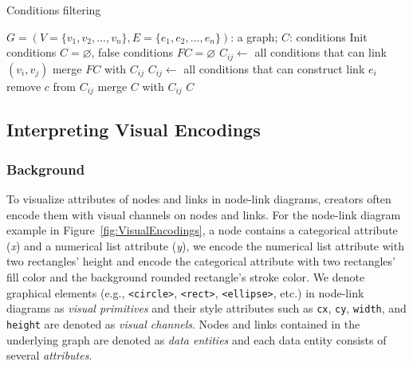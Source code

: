 


\begin{algorithm}[!t]
    \renewcommand\arraystretch{1.2}
    \caption{ Conditions filtering }
    \label{alg:conditions}
    \begin{algorithmic}[1]
        \Require
            $G=(V=\{v_1, v_2, ..., v_n\}, E=\{e_1, e_2, ..., e_n\})$: a graph;
        \Ensure
            $C$: conditions
        \State Init conditions $C=\varnothing$, false conditions $FC=\varnothing$
                \State $C_{ij} \gets$ all conditions that can link $(v_i, v_j)$
                \State merge $FC$ with $C_{ij}$
            \EndIf
        \EndFor
            \State $C_{ij} \gets$ all conditions that can construct link $e_i$
                    \State remove $c$ from $C_{ij}$
                \EndIf
            \EndFor
            \State merge $C$ with $C_{ij}$
        \EndFor
        \State \Return $C$
    \end{algorithmic}
\end{algorithm}


\subsection{Interpreting Visual Encodings}
\subsubsection{Background}
To visualize attributes of nodes and links in node-link diagrams, creators often encode them with visual channels on nodes and links.
For the node-link diagram example in Figure~\ref{fig:VisualEncodings}, a node contains a categorical attribute (\textit{x}) and a numerical list attribute (\textit{y}), we encode the numerical list attribute with two rectangles' height and encode the categorical attribute with two rectangles' fill color and the background rounded rectangle's stroke color.
We denote graphical elements (e.g., \texttt{<circle>}, \texttt{<rect>}, \texttt{<ellipse>}, etc.) in node-link diagrams as \textit{visual primitives} and their style attributes such as \texttt{cx}, \texttt{cy}, \texttt{width}, and \texttt{height} are denoted as \textit{visual channels}.
Nodes and links contained in the underlying graph are denoted as \textit{data entities} and each data entity consists of several \textit{attributes}.

